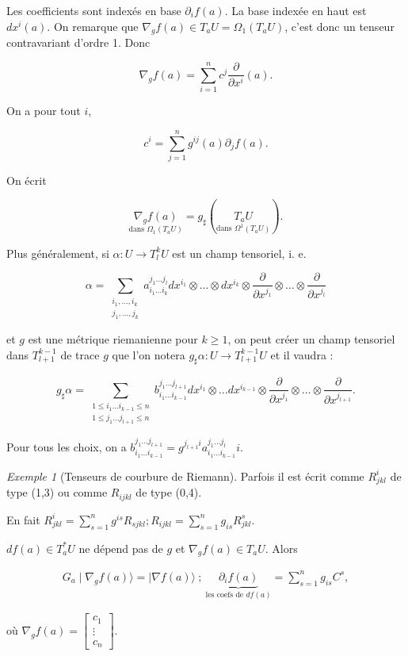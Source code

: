 \documentclass[french]{article}
\theoremstyle{definition}
\theoremstyle{remark}
\newtheorem*{protoexemple}{Exemple}
\newenvironment{exemple}
    {\colorlet{shadecolor}{gray!10}\begin{shaded}\begin{protoexemple}}
    {\end{protoexemple}\end{shaded}}
\begin{document}
Les coefficients sont indexés en base \(\partial_i f(a)\). La base indexée en haut est \(d x^{i}(a)\). On remarque que \(\nabla_gf(a) \in T_a U = \Omega_1(T_a U)\), c'est donc un tenseur contravariant d'ordre 1. Donc

\[\nabla_g f(a) = \sum_{i=1}^{n} c ^{j} \frac{\partial  }{\partial x ^{i}}(a).\]

On a pour tout \(i\),

\[c ^{i} = \sum_{j=1}^{n} g ^{ij}(a) \partial_j f(a).\]

On écrit

\[\underset{\text{dans } \Omega_1(T_a U)}{\nabla_g f(a)} = g _{\sharp}(\underset{\text{dans } \Omega ^{1}(T_a U)}{T_a U}).\]

Plus généralement, si \(\alpha : U \longrightarrow T_l ^{k} U\) est un champ tensoriel, i. e.

\[\alpha = \sum_{\substack{i_1, \dots, i _{k}\\ j_1, \dots, j_k}} a ^{j_1 \dots j_l}_{i_1 \dots i_k} d x^{i_1} \otimes \dots \otimes d x^{i_k} \otimes \frac{\partial  }{\partial x ^{j_1}} \otimes \dots \otimes \frac{\partial  }{\partial x ^{j_l}}\]

et \(g\) est une métrique riemanienne pour \(k \geq 1\), on peut créer un champ tensoriel dans \(T ^{k-1}_{l+1}\) de trace \(g\) que l'on notera \(g _{\sharp}\alpha : U \longrightarrow T ^{k-1}_{l+1} U\) et il vaudra :

\[g _{\sharp} \alpha= \sum_{\substack{1 \leq i_1 \dots i _{k-1} \leq n\\ 1 \leq j_1 \dots j _{l+1} \leq  n}} b _{i_1 \dots i _{k-1}}^{j_1 \dots j _{l+1}} d x^{i_1} \otimes \dots d x^{i _{k-1}} \otimes \frac{\partial  }{\partial x ^{j_1}} \otimes \dots \otimes \frac{\partial  }{\partial x ^{j _{l+1}}}.\]

Pour tous les choix, on a \(b _{i_1 \dots i _{k-1}}^{j_1 \dots j _{l+1}} = \displaystyle g ^{j _{l+1}i} a ^{j_1 \dots j_l}_{i_1 \dots i _{k-1}}i\).

\begin{exemple}[Tenseurs de courbure de Riemann]
  Parfois il est écrit comme \(R _{jkl}^{i}\) de type (1,3) ou comme \(R _{ijkl}\) de type (0,4).

  En fait \(R _{jkl}^{i} = \displaystyle\sum_{s=1}^{n} g ^{is} R _{sjkl} ; R _{ijkl} = \displaystyle\sum_{s=1}^{n} g _{is} R ^{s}_{jkl}\).

  \(d f(a) \in T_a ^{*}U\) ne dépend pas de \(g\) et \(\nabla_g f(a) \in T_a U\). Alors

  \begin{gather*}
    G_a \mid \nabla_g f(a)  \rangle = \mid \nabla f(a) \rangle \ ; \ \underbrace{\partial_i f(a)}_{\text{les coefs de } d f(a)} = \sum_{s=1}^{n} g _{is} C ^{s},
  \end{gather*}



  où \(\nabla_g f(a) = \displaystyle \begin{bmatrix}
    c_1 \\
    \vdots \\
    c_n
  \end{bmatrix}.\)

\end{exemple}
\end{document}

